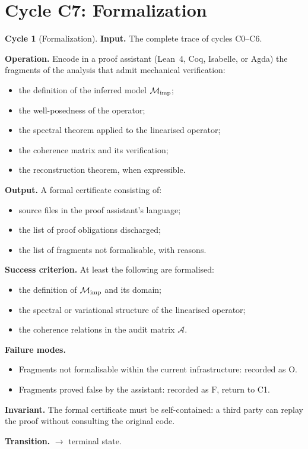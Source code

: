 \documentclass[11pt,a4paper]{article}
\theoremstyle{definition}
\newtheorem{cycle}{Cycle}[section]
\theoremstyle{plain}
\newcommand{\Mcal}{\mathcal{M}}
\newcommand{\Acal}{\mathcal{A}}
\newcommand{\Omark}{\mathrm{O}}
\newcommand{\Fmark}{\mathrm{F}}
\begin{document}
\section{Cycle C7: Formalization}
\label{sec:c7}

\begin{cycle}[Formalization]\label{cy:c7}
\textbf{Input.} The complete trace of cycles C0--C6.

\medskip
\textbf{Operation.} Encode in a proof assistant (Lean~4, Coq,
Isabelle, or Agda) the fragments of the analysis that admit
mechanical verification:
\begin{itemize}
  \item the definition of the inferred model $\Mcal_{\rm imp}$;
  \item the well-posedness of the operator;
  \item the spectral theorem applied to the linearised operator;
  \item the coherence matrix and its verification;
  \item the reconstruction theorem, when expressible.
\end{itemize}

\medskip
\textbf{Output.} A formal certificate consisting of:
\begin{itemize}
  \item source files in the proof assistant's language;
  \item the list of proof obligations discharged;
  \item the list of fragments not formalisable, with reasons.
\end{itemize}

\medskip
\textbf{Success criterion.} At least the following are formalised:
\begin{itemize}
  \item the definition of $\Mcal_{\rm imp}$ and its domain;
  \item the spectral or variational structure of the linearised
        operator;
  \item the coherence relations in the audit matrix $\Acal$.
\end{itemize}

\medskip
\textbf{Failure modes.}
\begin{itemize}
  \item Fragments not formalisable within the current
        infrastructure: recorded as $\Omark$.
  \item Fragments proved false by the assistant: recorded as
        $\Fmark$, return to C1.
\end{itemize}

\medskip
\textbf{Invariant.} The formal certificate must be self-contained:
a third party can replay the proof without consulting the
original code.

\medskip
\textbf{Transition.} $\to$ terminal state.
\end{cycle}
\end{document}
